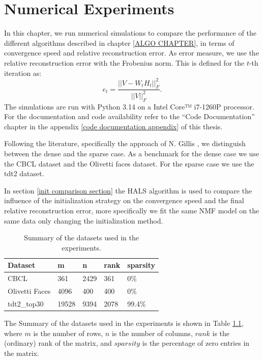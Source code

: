\chapter{Numerical Experiments} \label{Experiments chapter}

In this chapter, we run numerical simulations to compare the performance of the different algorithms described in chapter \ref{ALGO CHAPTER}, in terms of convergence speed and relative reconstruction error.
As error measure, we use the relative reconstruction error with the Frobenius norm. This is defined for the $t$-th iteration as:
\begin{equation}\label{relative fro error}
    e_t = \frac{||V - W_t H_t||_F^2}{||V||_F^2}.
\end{equation}
The simulations are run with Python 3.14 on a Intel Core™ i7-1260P processor. For the documentation and code availability refer to the ``Code Documentation'' chapter in the appendix \ref{code documentation appendix} of this thesis.
\par
Following the literature, specifically the approach of N. Gillis \cite{gillis2020nonnegative}, we distinguish between the dense and the sparse case.
As a benchmark for the dense case we use the CBCL dataset and the Olivetti faces dataset. For the sparse case we use the tdt2 dataset.

In section \ref{init comparison section} the HALS algorithm is used to compare the influence of the initialization strategy on the convergence speed and the final relative reconstruction error, more specifically we fit the same NMF model on the same data only changing the initialization method.

\begin{table}[ht]
\centering
\begin{tabular}{lllll}
\hline
\multicolumn{1}{|l|}{Dataset}         & \multicolumn{1}{l|}{m}   & \multicolumn{1}{l|}{n}    & \multicolumn{1}{l|}{rank} & \multicolumn{1}{l|}{sparsity} \\ \hline
\multicolumn{1}{|l|}{CBCL}            & \multicolumn{1}{l|}{361} & \multicolumn{1}{l|}{2429} & \multicolumn{1}{l|}{361}  & \multicolumn{1}{l|}{0\%}      \\ \hline
\multicolumn{1}{|l|}{Olivetti Faces}     & \multicolumn{1}{l|}{4096}    & \multicolumn{1}{l|}{400}     & \multicolumn{1}{l|}{400}     & \multicolumn{1}{l|}{0\%}         \\ \hline
\multicolumn{1}{|l|}{tdt2\_top30}     & \multicolumn{1}{l|}{19528}    & \multicolumn{1}{l|}{9394}     & \multicolumn{1}{l|}{2078}     & \multicolumn{1}{l|}{99.4\%}         \\ \hline
\end{tabular}
\caption{Summary of the datasets used in the experiments.}
\label{Summary of dataset}
\end{table}
The Summary of the datasets used in the experiments is shown in Table \ref{Summary of dataset}, where $m$ is the number of rows, $n$ is the number of columns, $rank$ is the (ordinary) rank of the matrix, and $sparsity$ is the percentage of zero entries in the matrix.


